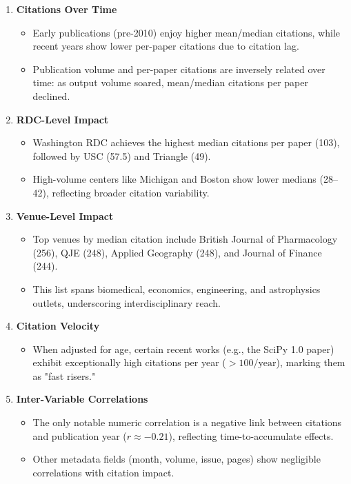 \documentclass[12pt]{article}
\begin{document}
\begin{enumerate}
  \item \textbf{Citations Over Time}
    \begin{itemize}
      \item Early publications (pre-2010) enjoy higher mean/median citations, while recent years show lower per-paper citations due to citation lag.
      \item Publication volume and per-paper citations are inversely related over time: as output volume soared, mean/median citations per paper declined.
    \end{itemize}

  \item \textbf{RDC-Level Impact}
    \begin{itemize}
      \item Washington RDC achieves the highest median citations per paper (103), followed by USC (57.5) and Triangle (49).
      \item High-volume centers like Michigan and Boston show lower medians (28–42), reflecting broader citation variability.
    \end{itemize}

  \item \textbf{Venue-Level Impact}
    \begin{itemize}
      \item Top venues by median citation include British Journal of Pharmacology (256), QJE (248), Applied Geography (248), and Journal of Finance (244).
      \item This list spans biomedical, economics, engineering, and astrophysics outlets, underscoring interdisciplinary reach.
    \end{itemize}

  \item \textbf{Citation Velocity}
    \begin{itemize}
      \item When adjusted for age, certain recent works (e.g., the SciPy 1.0 paper) exhibit exceptionally high citations per year (\(>100/\text{year}\)), marking them as "fast risers."
    \end{itemize}

  \item \textbf{Inter-Variable Correlations}
    \begin{itemize}
      \item The only notable numeric correlation is a negative link between citations and publication year (\(r\approx -0.21\)), reflecting time-to-accumulate effects.
      \item Other metadata fields (month, volume, issue, pages) show negligible correlations with citation impact.
    \end{itemize}
\end{enumerate}
\end{document}
